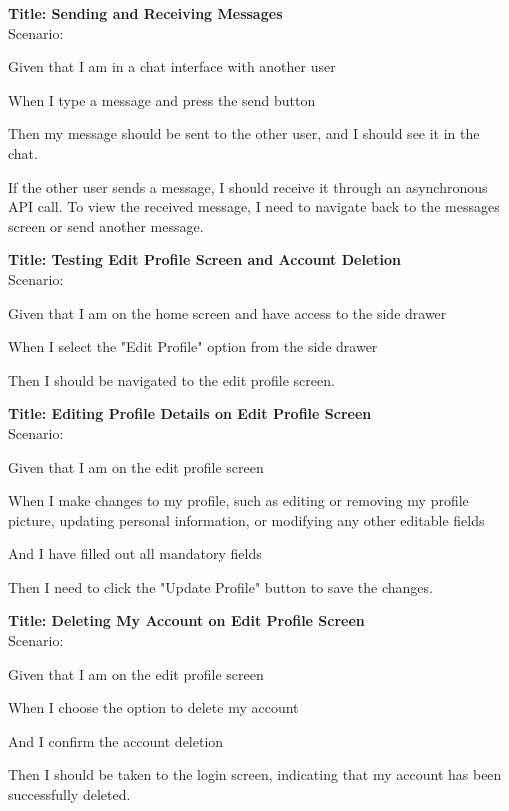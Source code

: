 \bigskip
\textbf{Title: Sending and Receiving Messages} \\
Scenario:
\begin{compactitem}
    \item Given that I am in a chat interface with another user
    \item When I type a message and press the send button
    \item Then my message should be sent to the other user, and I should see it in the chat.
    \item If the other user sends a message, I should receive it through an asynchronous API call. To view the received message, I need to navigate back to the messages screen or send another message. 
\end{compactitem}

\bigskip
\textbf{Title: Testing Edit Profile Screen and Account Deletion} \\
Scenario:
\begin{compactitem}
    \item Given that I am on the home screen and have access to the side drawer
    \item When I select the "Edit Profile" option from the side drawer
    \item Then I should be navigated to the edit profile screen.
\end{compactitem}

\bigskip
\textbf{Title: Editing Profile Details on Edit Profile Screen} \\
Scenario:
\begin{compactitem}
    \item Given that I am on the edit profile screen
    \item When I make changes to my profile, such as editing or removing my profile picture, updating personal information, or modifying any other editable fields
    \item And I have filled out all mandatory fields
    \item Then I need to click the "Update Profile" button to save the changes.
\end{compactitem}

\bigskip
\textbf{Title: Deleting My Account on Edit Profile Screen} \\
Scenario:
\begin{compactitem}
    \item Given that I am on the edit profile screen
    \item When I choose the option to delete my account
    \item And I confirm the account deletion
    \item Then I should be taken to the login screen, indicating that my account has been successfully deleted.
\end{compactitem}

